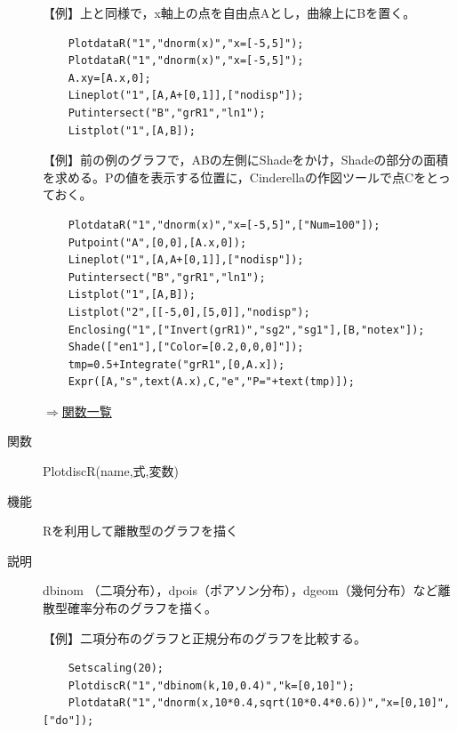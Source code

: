 \documentclass[papersize,a4paper,12pt,uplatex]{jsarticle}
\begin{document}
\begin{description}
\vspace{\baselineskip}
【例】上と同様で，x軸上の点を自由点Aとし，曲線上にBを置く。
\begin{verbatim}
    PlotdataR("1","dnorm(x)","x=[-5,5]");
    PlotdataR("1","dnorm(x)","x=[-5,5]");
    A.xy=[A.x,0];
    Lineplot("1",[A,A+[0,1]],["nodisp"]);
    Putintersect("B","grR1","ln1");
    Listplot("1",[A,B]);
\end{verbatim}
\vspace{\baselineskip}
【例】前の例のグラフで，ABの左側にShadeをかけ，Shadeの部分の面積を求める。Pの値を表示する位置に，Cinderellaの作図ツールで点Cをとっておく。
\begin{verbatim}
    PlotdataR("1","dnorm(x)","x=[-5,5]",["Num=100"]);
    Putpoint("A",[0,0],[A.x,0]);
    Lineplot("1",[A,A+[0,1]],["nodisp"]);
    Putintersect("B","grR1","ln1");
    Listplot("1",[A,B]);
    Listplot("2",[[-5,0],[5,0]],"nodisp");
    Enclosing("1",["Invert(grR1)","sg2","sg1"],[B,"notex"]);
    Shade(["en1"],["Color=[0.2,0,0,0]"]);
    tmp=0.5+Integrate("grR1",[0,A.x]);
    Expr([A,"s",text(A.x),C,"e","P="+text(tmp)]);
\end{verbatim}

    \begin{center}  \end{center}

\vspace{\baselineskip}
\begin{flushright}  \hyperlink{functionlist}{$\Rightarrow$関数一覧}\end{flushright}

\vspace{\baselineskip}
\hypertarget{plotdiscr}{}
\item[関数]  PlotdiscR(name,式,変数)
\item[機能]  Rを利用して離散型のグラフを描く
\item[説明]  dbinom （二項分布），dpois（ポアソン分布），dgeom（幾何分布）など離散型確率分布のグラフを描く。

\vspace{\baselineskip}
【例】二項分布のグラフと正規分布のグラフを比較する。
\begin{verbatim}
    Setscaling(20);
    PlotdiscR("1","dbinom(k,10,0.4)","k=[0,10]");
    PlotdataR("1","dnorm(x,10*0.4,sqrt(10*0.4*0.6))","x=[0,10]",["do"]);
\end{verbatim}
\vspace{\baselineskip}
    \begin{center}  \end{center}


\end{description}
\end{document}
